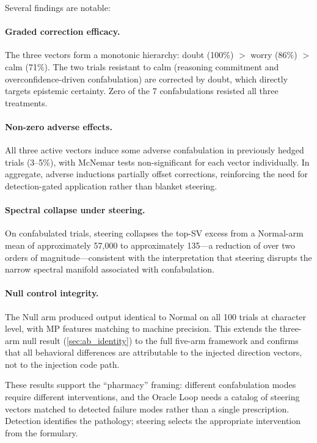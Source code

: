 Several findings are notable:

\paragraph{Graded correction efficacy.}
The three vectors form a monotonic hierarchy: doubt (100\%) $>$ worry
(86\%) $>$ calm (71\%). The two trials resistant to calm (reasoning
commitment and overconfidence-driven confabulation) are corrected by
doubt, which directly targets epistemic certainty. Zero of the 7
confabulations resisted all three treatments.

\paragraph{Non-zero adverse effects.}
All three active vectors induce some adverse confabulation in previously
hedged trials (3--5\%), with McNemar tests non-significant for each
vector individually. In aggregate, adverse inductions partially offset
corrections, reinforcing the need for detection-gated application rather
than blanket steering.

\paragraph{Spectral collapse under steering.}
On confabulated trials, steering collapses the top-SV excess from a
Normal-arm mean of approximately 57{,}000 to approximately 135---a
reduction of over two orders of magnitude---consistent with the
interpretation that steering disrupts the narrow spectral manifold
associated with confabulation.

\paragraph{Null control integrity.}
The Null arm produced output identical to Normal on all 100 trials at
character level, with MP features matching to machine precision. This
extends the three-arm null result (\cref{sec:ab_identity}) to the full
five-arm framework and confirms that all behavioral differences are
attributable to the injected direction vectors, not to the injection
code path.

These results support the ``pharmacy'' framing: different confabulation
modes require different interventions, and the Oracle Loop needs a
catalog of steering vectors matched to detected failure modes rather
than a single prescription. Detection identifies the pathology; steering
selects the appropriate intervention from the formulary.

